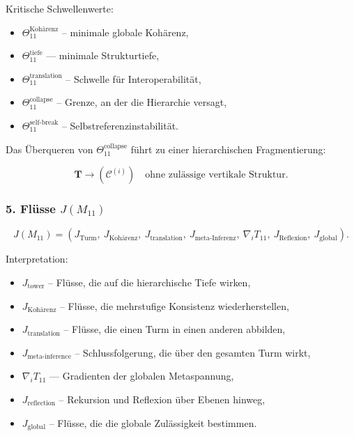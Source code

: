 Kritische Schwellenwerte:

\begin{itemize}
    \item $\Theta_{11}^{\mathrm{Kohärenz}}$ – minimale globale Kohärenz,
    \item $\Theta_{11}^{\mathrm{tiefe}}$ — minimale Strukturtiefe,
    \item $\Theta_{11}^{\mathrm{translation}}$ – Schwelle für Interoperabilität,
    \item $\Theta_{11}^{\mathrm{collapse}}$ – Grenze, an der die Hierarchie versagt,
    \item $\Theta_{11}^{\mathrm{self\mbox{-}break}}$ – Selbstreferenzinstabilität.
\end{itemize}

Das Überqueren von $\Theta_{11}^{\mathrm{collapse}}$ führt zu einer hierarchischen Fragmentierung:

\[
\mathbf{T} \to (\mathcal{C}^{(i)}) \quad \text{ohne zulässige vertikale Struktur}.
\]

\subsubsection*{5. Flüsse $J(M_{11})$}

\[
J(M_{11}) =
(
J_{\mathrm{Turm}},\
J_{\mathrm{Kohärenz}},\
J_{\mathrm{translation}},\
J_{\mathrm{meta\mbox{-}Inferenz}},\
\nabla_i T_{11},\
J_{\mathrm{Reflexion}},\
J_{\mathrm{global}}
).
\]

Interpretation:

\begin{itemize}
    \item $J_{\mathrm{tower}}$ – Flüsse, die auf die hierarchische Tiefe wirken,
    \item $J_{\mathrm{Kohärenz}}$ – Flüsse, die mehrstufige Konsistenz wiederherstellen,
    \item $J_{\mathrm{translation}}$ – Flüsse, die einen Turm in einen anderen abbilden,
    \item $J_{\mathrm{meta\mbox{-}inference}}$ – Schlussfolgerung, die über den gesamten Turm wirkt,
    \item $\nabla_i T_{11}$ — Gradienten der globalen Metaspannung,
    \item $J_{\mathrm{reflection}}$ – Rekursion und Reflexion über Ebenen hinweg,
    \item $J_{\mathrm{global}}$ – Flüsse, die die globale Zulässigkeit bestimmen.
\end{itemize}


